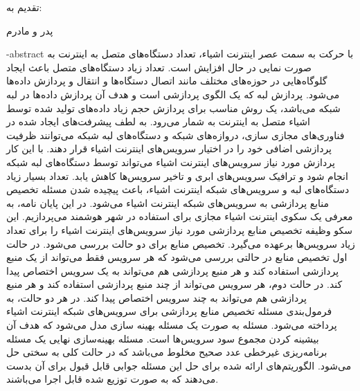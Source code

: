 \cleartorightpage
\esalatPage

\cleartorightpage
\thispagestyle{empty}
{\Large تقدیم به:} \\
\begin{flushleft}
  {
    \huge
    پدر و مادرم
  }
\end{flushleft}

\cleartorightpage
{}

\fa-abstract{
  با حرکت به سمت عصر اینترنت اشیاء، تعداد دستگاه‌های متصل به اینترنت به صورت نمایی در حال افزایش است.
  تعداد زیاد دستگاه‌های متصل باعث ایجاد گلوگاه‌هایی در حوزه‌های مختلف مانند اتصال دستگاه‌ها و انتقال و پردازش داده‌ها می‌شود.
  پردازش لبه که یک الگوی پردازشی است و هدف آن پردازش داده‌ها در لبه شبکه می‌باشد، یک روش مناسب برای پردازش حجم زیاد داده‌های تولید شده توسط اشیاء متصل به اینترنت به شمار می‌رود.
  به لطف پیشرفت‌های ایجاد شده در فناوری‌های مجازی سازی، دروازه‌های شبکه و دستگاه‌های لبه شبکه می‌توانند ظرفیت پردازشی اضافی خود را در اختیار سرویس‌های اینترنت اشیاء قرار دهند.
  با این کار پردازش‌ مورد نیاز سرویس‌های اینترنت اشیاء می‌تواند توسط دستگاه‌های لبه شبکه انجام شود و ترافیک سرویس‌های ابری و تاخیر سرویس‌ها کاهش یابد.
  تعداد بسیار زیاد دستگاه‌های لبه و سرویس‌های شبکه اینترنت اشیاء، باعث پیچیده شدن مسئله تخصیص منابع پردازشی به سرویس‌های شبکه اینترنت اشیاء می‌شود.
  در این پایان نامه، به معرفی یک سکوی اینترنت اشیاء مجازی برای استفاده در شهر هوشمند می‌پردازیم.
  این سکو وظیفه تخصیص منابع پردازشی مورد نیاز سرویس‌های اینترنت اشیاء را برای تعداد زیاد سرویس‌ها برعهده می‌گیرد.
  تخصیص منابع برای دو حالت بررسی می‌شود.
  در حالت اول تخصیص منابع در حالتی بررسی می‌شود که هر سرویس فقط می‌تواند از یک منبع پردازشی استفاده کند و هر منبع پردازشی هم می‌تواند به یک سرویس اختصاص پیدا کند.
  در حالت دوم، هر سرویس می‌تواند از چند منبع پردازشی استفاده کند و هر منبع پردازشی هم می‌تواند به چند سرویس اختصاص پیدا کند.
  در هر دو حالت، به فرمول‌بندی مسئله تخصیص منابع پردازشی برای سرویس‌های شبکه اینترنت اشیاء پرداخته می‌شود.
  مسئله به صورت یک مسئله بهینه سازی مدل می‌شود که هدف آن بیشینه کردن مجموع سود سرویس‌ها است.
  مسئله بهینه‌سازی نهایی یک مسئله برنامه‌ریزی غیرخطی عدد صحیح مخلوط می‌باشد که در حالت کلی به سختی حل می‌شود.
  الگوریتم‌های ارائه شده برای حل این مسئله جوابی قابل قبول برای آن بدست می‌دهند که به صورت توزیع شده قابل اجرا می‌باشند.
}

\cleartorightpage
\abstractPage

\cleartorightpage
